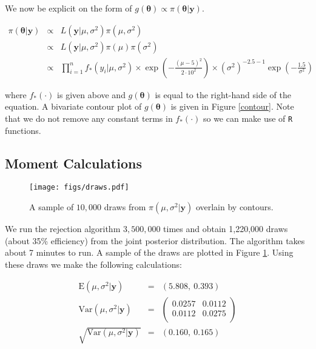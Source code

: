\documentclass[12pt]{article}
\newcommand{\m}[1]{\mathbf{\bm{#1}}}
\begin{document}
\noindent We now be explicit on the form of $g(\m{\theta}) \propto \pi(\m{\theta}|\m{y})$.

\begin{eqnarray*}
\pi(\m{\theta}|\m{y}) &\propto& L(\m{y}|\mu, \sigma^2)\pi(\mu, \sigma^2) \\
&\propto& L(\m{y}|\mu, \sigma^2)\pi(\mu)\pi(\sigma^2) \\
&\propto& \prod_{i=1}^n f_*(y_i|\mu,\sigma^2)\times \exp\left(-\frac{(\mu-5)^2}{2\cdot10^2}\right) \times (\sigma^2)^{-2.5-1}\exp\left(-\frac{1.5}{\sigma^2}\right)
\end{eqnarray*}

\noindent where $f_*(\cdot)$ is given above and $g(\m{\theta})$ is equal to the right-hand side of the equation. A bivariate contour plot of $g(\m{\theta})$ is given in Figure \ref{contour}. Note that we do not remove any constant terms in $f_*(\cdot)$ so we can make use of \texttt{R} functions.

\subsection{Moment Calculations}

\begin{figure}
    \begin{center}
    \texttt{[image: figs/draws.pdf]}
    \end{center}
    \caption{A sample of $10,000$ draws from $\pi(\mu,\sigma^2|\m{y})$ overlain by contours.}
    \label{draws}
\end{figure}

\noindent We run the rejection algorithm $3,500,000$ times and obtain 1,220,000 draws (about 35\% efficiency) from the joint posterior distribution. The algorithm takes about 7 minutes to run. A sample of the draws are plotted in Figure \ref{draws}. Using these draws we make the following calculations:

\begin{eqnarray*}
\mathrm{E}(\mu,\sigma^2|\m{y}) &=& (5.808,~0.393) \\
\mathrm{Var}(\mu, \sigma^2|\m{y}) &=& \left(\begin{array}{ll} 0.0257 & 0.0112 \\ 0.0112 & 0.0275 \\ \end{array}\right) \\
\sqrt{\mathrm{Var}(\mu, \sigma^2|\m{y})} &=& (0.160,~0.165)
\end{eqnarray*}
\end{document}
